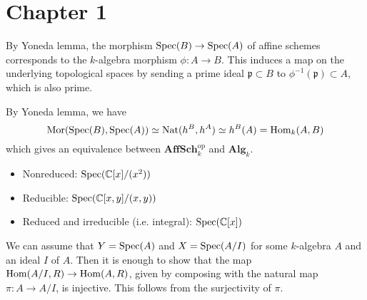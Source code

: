 \newpage
\section{Chapter 1}


\begin{problem} \notfinish
By Yoneda lemma, the morphism $\operatorname{\mathrm{Spec}}(B) \to \operatorname{\mathrm{Spec}}(A)$ of affine schemes
corresponds to the $k$-algebra morphism $\phi: A \to B$.
This induces a map on the underlying topological spaces by sending a prime ideal
$\mathfrak{p} \subset B$ to $\phi^{-1}(\mathfrak{p}) \subset A$, which is also prime.
\end{problem}

\begin{problem} \notfinish
\end{problem}

\begin{problem}
By Yoneda lemma, we have 
$$
\mathrm{Mor}(\operatorname{\mathrm{Spec}}(B), \operatorname{\mathrm{Spec}}(A)) \simeq \mathrm{Nat}(h^{B}, h^{A}) \simeq h^{B}(A) = \operatorname{\mathrm{Hom}}_{k}(A, B)
$$
which gives an equivalence between $\mathbf{AffSch}_{k}^{\mathrm{op}}$ and $\mathbf{Alg}_{k}$.
\end{problem}

\begin{problem}
    \begin{itemize}
        \item Nonreduced: $\operatorname{\mathrm{Spec}}(\mathbb{C}[x]/(x^{2}))$
        \item Reducible: $\operatorname{\mathrm{Spec}}(\mathbb{C}[x, y]/(x, y))$
        \item Reduced and irreducible (i.e. integral): $\operatorname{\mathrm{Spec}}(\mathbb{C}[x])$
    \end{itemize}
\end{problem}

\begin{problem} 
We can assume that $Y = \operatorname{\mathrm{Spec}}(A)$ and $X = \operatorname{\mathrm{Spec}}(A/I)$ for some $k$-algebra $A$ and an ideal $I$ of $A$.
Then it is enough to show that the map $\operatorname{\mathrm{Hom}}(A/I, R) \to \operatorname{\mathrm{Hom}}(A, R)$, given by composing with
the natural map $\pi: A \to A/I$, is injective.
This follows from the surjectivity of $\pi$.
\end{problem}

